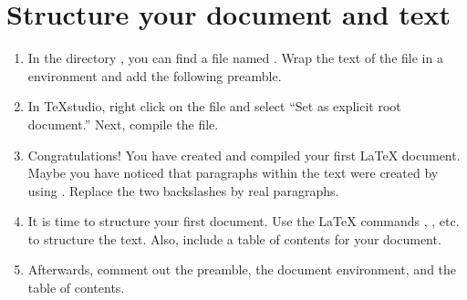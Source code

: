 \section{Structure your document and text}

\begin{enumerate}
	\item In the directory , you can find a file named . Wrap the text of the file in a  environment and add the following preamble. 
	\item In TeXstudio, right click on the file and select \enquote{Set as explicit root document.} Next, compile the file.
	\item Congratulations! You have created and compiled your first \LaTeX{} 
	document. Maybe you have noticed that paragraphs within the text were 
	created by using . Replace the 
	two backslashes by real paragraphs.
	\item It is time to structure your first document. Use the \LaTeX{} 
	commands , 
	, etc. to structure the text. 
	Also, 
	include 
	a table of contents for your document. 
	\item Afterwards, comment out the preamble, the document environment, and the table of contents. 
\end{enumerate}
